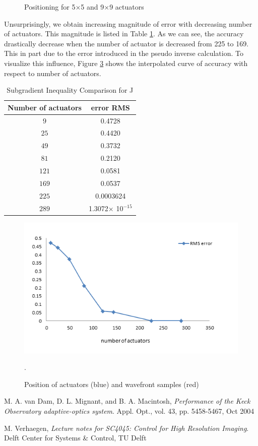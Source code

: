 \documentclass[]{article}
\begin{document}
\begin{figure}[h!]
\begin{subfigure}[b]{0.4\textwidth}
                \label{fig:mirror_config9}
        \end{subfigure}
        \caption{Positioning for 5$\times$5 and 9$\times$9 actuators}
        \label{fig:mirror_configs}
\end{figure}

Unsurprisingly, we obtain increasing magnitude of error with decreasing number of actuators. This magnitude is listed in Table \ref{tab:act}. As we can see, the accuracy drastically decrease when the number of actuator is decreased from 225 to 169. This in part due to the error introduced in the pseudo inverse calculation. To visualize this influence, Figure \ref{approx_power} shows the interpolated curve of accuracy with respect to number of actuators.

\begin{table}[h!]
\centering
\caption{Subgradient Inequality Comparison for J}  
    \label{tab:act}
    \begin{tabular}{c|c}
        \toprule
        Number of actuators & error RMS\\
        \midrule        
        $ 9 $ & 0.4728 \\
        $ 25 $ &  0.4420 \\
        $ 49 $ &  0.3732 \\
        $ 81 $ &  0.2120 \\
        $ 121 $ & 0.0581 \\
        $ 169 $ & 0.0537 \\
		$ 225 $ & 0.0003624 \\
		$ 289 $ & 1.3072$ \times $ 10$ ^{-15} $ \\        		
        \bottomrule
    \end{tabular}
\end{table}


\begin{figure}[h!]
\centering
\includegraphics[width=0.7\linewidth]{figures/approx_power}
\caption{Position of actuators (blue) and wavefront samples (red)}.
\label{approx_power}
\end{figure}

\begin{thebibliography}{9}

  M. A. van Dam, D. L. Mignant, and B. A. Macintosh,
  \emph{Performance of the Keck Observatory adaptive-optics system}.
  Appl. Opt., vol. 43, pp. 5458-5467, Oct 2004

  M. Verhaegen,
  \emph{Lecture notes for SC4045: Control for High Resolution Imaging}.
  Delft Center for Systems \& Control, TU Delft

\end{thebibliography}
\end{document}
